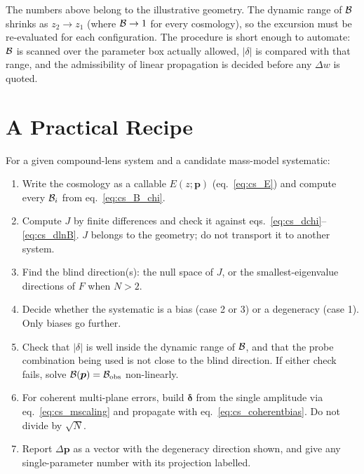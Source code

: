 \begin{annotation}
The numbers above belong to the illustrative geometry. The dynamic range
of $\mathcal{B}$ shrinks as $z_2\to z_1$ (where $\mathcal{B}\to1$ for every
cosmology), so the excursion must be re-evaluated for each
configuration. The procedure is short enough to automate: $\mathcal{B}$ is
scanned over the parameter box actually allowed, $|\delta|$ is compared
with that range, and the admissibility of linear propagation is decided
before any $\Delta w$ is quoted.
\end{annotation}


\section{A Practical Recipe}
\label{sec:cs_recipe}

For a given compound-lens system and a candidate mass-model systematic:
\begin{enumerate}
  \item Write the cosmology as a callable $E(z;\bm{p})$
  (eq.~\ref{eq:cs_E}) and compute every $\mathcal{B}_i$ from
  eq.~\eqref{eq:cs_B_chi}.
  \item Compute $J$ by finite differences and check it against
  eqs.~\eqref{eq:cs_dchi}--\eqref{eq:cs_dlnB}. $J$ belongs to the
  geometry; do not transport it to another system.
  \item Find the blind direction(s): the null space of $J$, or the
  smallest-eigenvalue directions of $F$ when $N>2$.
  \item Decide whether the systematic is a bias (case 2 or 3) or a
  degeneracy (case 1). Only biases go further.
  \item Check that $|\delta|$ is well inside the dynamic range of
  $\mathcal{B}$, and that the probe combination being used is not close to the
  blind direction. If either check fails, solve
  $\mathcal{B}(\bm{p})=\mathcal{B}_{\rm obs}$ non-linearly.
  \item For coherent multi-plane errors, build $\bm{\delta}$ from the
  single amplitude via eq.~\eqref{eq:cs_mscaling} and propagate with
  eq.~\eqref{eq:cs_coherentbias}. Do not divide by $\sqrt{N}$.
  \item Report $\Delta\bm{p}$ as a vector with the degeneracy direction
  shown, and give any single-parameter number with its projection
  labelled.
\end{enumerate}

